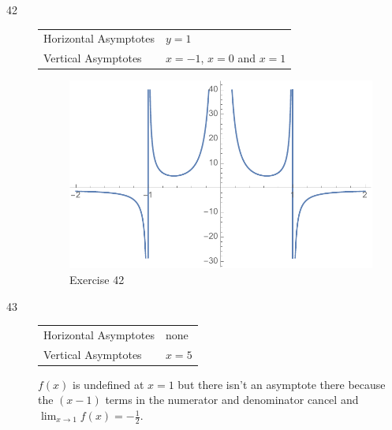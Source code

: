 \documentclass[letterpaper]{exam}
\begin{document}
\begin{description}
      \newpage

      \item[42]
        \begin{tabular}[H]{ll}
          \toprule
          Horizontal Asymptotes & $y = 1$ \\
          Vertical Asymptotes   & $x = -1$, $x = 0$ and $x = 1$ \\
          \bottomrule
        \end{tabular}

        \begin{figure}[H]
          \centering
          \includegraphics[scale = 0.5]{ex42.pdf}
          \caption{Exercise 42}
          \label{fig:ex42}
        \end{figure}

      \item[43]
        \begin{tabular}[H]{ll}
          \toprule
          Horizontal Asymptotes & none \\
          Vertical Asymptotes   & $x = 5$ \\
          \bottomrule
        \end{tabular}

        $f(x)$ is undefined at $x = 1$ but there isn't an asymptote there because the
        $(x - 1)$ terms in the numerator and denominator cancel and 
        $\lim_{x \to 1} f(x) = -\frac{1}{2}$.


\end{description}
\end{document}
